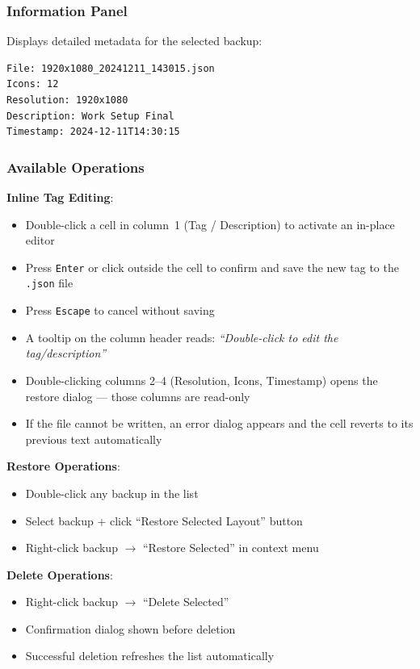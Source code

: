 \documentclass[a4paper,11pt]{article}
\begin{document}
\subsubsection{Information Panel}

Displays detailed metadata for the selected backup:

\begin{verbatim}
File: 1920x1080_20241211_143015.json
Icons: 12
Resolution: 1920x1080
Description: Work Setup Final
Timestamp: 2024-12-11T14:30:15
\end{verbatim}

\subsubsection{Available Operations}

\textbf{Inline Tag Editing}:
\begin{itemize}
  \item Double-click a cell in column~1 (Tag / Description) to activate
    an in-place editor
  \item Press \texttt{Enter} or click outside the cell to confirm and
    save the new tag to the \texttt{.json} file
  \item Press \texttt{Escape} to cancel without saving
  \item A tooltip on the column header reads:
    \textit{``Double-click to edit the tag/description''}
  \item Double-clicking columns 2--4 (Resolution, Icons, Timestamp)
    opens the restore dialog --- those columns are read-only
  \item If the file cannot be written, an error dialog appears and the
    cell reverts to its previous text automatically
\end{itemize}

\textbf{Restore Operations}:
\begin{itemize}
  \item Double-click any backup in the list
  \item Select backup + click ``Restore Selected Layout'' button
  \item Right-click backup $\rightarrow$ ``Restore Selected'' in context menu
\end{itemize}

\textbf{Delete Operations}:
\begin{itemize}
  \item Right-click backup $\rightarrow$ ``Delete Selected''
  \item Confirmation dialog shown before deletion
  \item Successful deletion refreshes the list automatically
\end{itemize}
\end{document}
